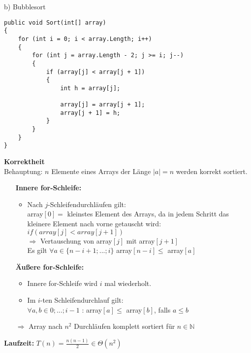 b) Bubblesort
\begin{verbatim}
public void Sort(int[] array)
{
    for (int i = 0; i < array.Length; i++)
    {
        for (int j = array.Length - 2; j >= i; j--)
        {
            if (array[j] < array[j + 1])
            {
                int h = array[j];

                array[j] = array[j + 1];
                array[j + 1] = h;
            }
        }
    }
}
\end{verbatim}

\textbf{Korrektheit} \\
Behauptung: $n$ Elemente eines Arrays der Länge $|a| = n$ werden korrekt sortiert.
\begin{itemize}[noitemsep]
    \item[] \textbf{Innere for-Schleife:}
    \item[] \begin{itemize}[nolistsep, noitemsep]
    	\item Nach $j$-Schleifendurchläufen gilt: \\
    	array$[0] =$ kleinstes Element des Arrays, da in jedem Schritt das kleinere Element nach vorne getauscht wird: 
        $if (array[j] < array[j+1])$ \\
        $\Rightarrow$ Vertauschung von array$[j]$ mit array$[j+1]$ \\
        Es gilt $\forall a \in \{n-i+1;...;i\}$ array$[n-i] \leq$ array$[a]$ \\
    \end{itemize}
    \item[] \textbf{Äußere for-Schleife:}
    \item[] \begin{itemize}[nolistsep, noitemsep]
    	\item Innere for-Schleife wird $i$ mal wiederholt.
        \item Im $i$-ten Schleifendurchlauf gilt: \\
        $\forall a,b \in {0;...;i-1}$ : array$[a] \leq$ array$[b]$, falls $a \leq b$
    \end{itemize}
    \item[$\Rightarrow$] Array nach $n^2$ Durchläufen komplett sortiert für $n \in \mathbb{N}$
\end{itemize}

\nuffsaid

\textbf{Laufzeit: } $T(n) = \frac{n(n - 1)}{2} \in \Theta(n^2)$